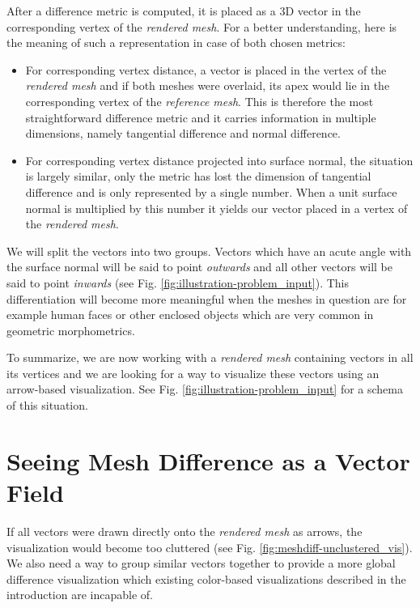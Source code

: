 After a difference metric is computed, it is placed as a 3D vector in the corresponding vertex of the {\it rendered mesh}. For a better understanding, here is the meaning of such a representation in case of both chosen metrics:

\begin{itemize}
\item For corresponding vertex distance, a vector is placed in the vertex of the {\it rendered mesh} and if both meshes were overlaid, its apex would lie in the corresponding vertex of the {\it reference mesh}. This is therefore the most straightforward difference metric and it carries information in multiple dimensions, namely tangential difference and normal difference.
\item For corresponding vertex distance projected into surface normal, the situation is largely similar, only the metric has lost the dimension of tangential difference and is only represented by a single number. When a unit surface normal is multiplied by this number it yields our vector placed in a vertex of the {\it rendered mesh}.
\end{itemize}

We will split the vectors into two groups. Vectors which have an acute angle with the surface normal will be said to point {\it outwards} and all other vectors will be said to point {\it inwards} (see Fig. \ref{fig:illustration-problem_input}). This differentiation will become more meaningful when the meshes in question are for example human faces or other enclosed objects which are very common in geometric morphometrics.

To summarize, we are now working with a {\it rendered mesh} containing vectors in all its vertices and we are looking for a way to visualize these vectors using an arrow-based visualization. See Fig. \ref{fig:illustration-problem_input} for a schema of this situation.

\section{Seeing Mesh Difference as a Vector Field}
\label{sec:analysis-abstraction}

If all vectors were drawn directly onto the {\it rendered mesh} as arrows, the visualization would become too cluttered (see Fig. \ref{fig:meshdiff-unclustered_vis}). We also need a way to group similar vectors together to provide a more global difference visualization which existing color-based visualizations described in the introduction are incapable of.

